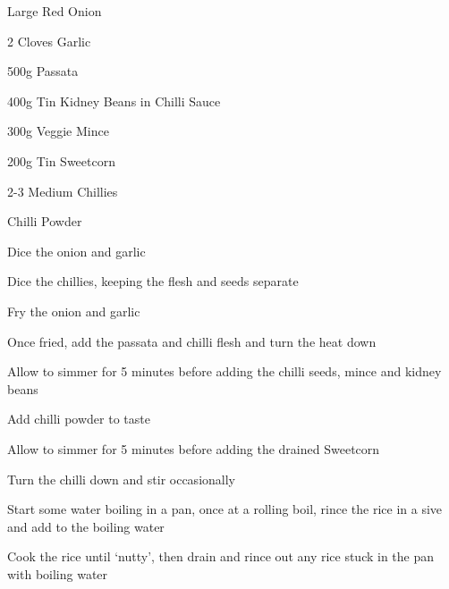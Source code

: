 {
  \item {} Large Red Onion
  \item 2 Cloves Garlic
  \item 500g Passata
  \item 400g Tin Kidney Beans in Chilli Sauce
  \item 300g Veggie Mince
  \item 200g Tin Sweetcorn
  \item 2-3 Medium Chillies
  \item Chilli Powder
}{
  \item Dice the onion and garlic
  \item Dice the chillies, keeping the flesh and seeds separate
  \item Fry the onion and garlic
  \item Once fried, add the passata and chilli flesh and turn the heat down
  \item Allow to simmer for 5 minutes before adding the chilli seeds, mince and kidney beans
  \item Add chilli powder to taste
  \item Allow to simmer for 5 minutes before adding the drained Sweetcorn
  \item Turn the chilli down and stir occasionally
  \item Start some water boiling in a pan, once at a rolling boil, rince the rice in a sive and add to the boiling water
  \item Cook the rice until `nutty', then drain and rince out any rice stuck in the pan with boiling water
}